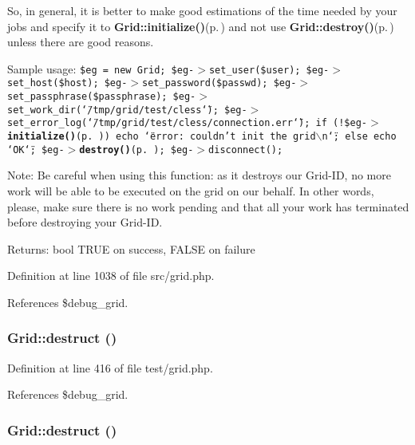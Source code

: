 So, in general, it is better to make good estimations of the time needed by your jobs and specify it to {\bf Grid::initialize()}{\rm (p.\,\pageref{classGrid_a11})} and not use {\bf Grid::destroy()}{\rm (p.\,\pageref{classGrid_a12})} unless there are good reasons.

Sample usage: {\tt  \$eg = new Grid; \$eg-$>$set\_\-user(\$user); \$eg-$>$set\_\-host(\$host); \$eg-$>$set\_\-password(\$passwd); \$eg-$>$set\_\-passphrase(\$passphrase); \$eg-$>$set\_\-work\_\-dir(\char`\"{}/tmp/grid/test/cless\char`\"{}); \$eg-$>$set\_\-error\_\-log(\char`\"{}/tmp/grid/test/cless/connection.err\char`\"{}); if (!\$eg-$>${\bf initialize()}{\rm (p.\,\pageref{classGrid_a11})}) echo \char`\"{}error: couldn't init the grid$\backslash$n\char`\"{}; else echo \char`\"{}OK\char`\"{}; \$eg-$>${\bf destroy()}{\rm (p.\,\pageref{classGrid_a12})}; \$eg-$>$disconnect(); }

\begin{Desc}
\item[Note:]Be careful when using this function: as it destroys our Grid-ID, no more work will be able to be executed on the grid on our behalf. In other words, please, make sure there is no work pending and that all your work has terminated before destroying your Grid-ID.\end{Desc}
\begin{Desc}
\item[Returns:]bool TRUE on success, FALSE on failure \end{Desc}


Definition at line 1038 of file src/grid.php.

References \$debug\_\-grid.
\subsubsection{\setlength{\rightskip}{0pt plus 5cm}Grid::destruct ()}\label{classGrid_a27}




Definition at line 416 of file test/grid.php.

References \$debug\_\-grid.
\subsubsection{\setlength{\rightskip}{0pt plus 5cm}Grid::destruct ()}\label{classGrid_a1}




